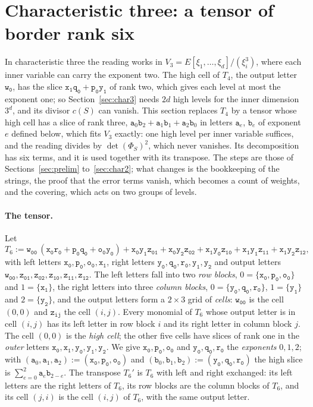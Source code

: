 \documentclass[11pt]{article}
\theoremstyle{definition}
\theoremstyle{remark}
\newcommand{\tl}[1]{\mathtt{#1}}
\begin{document}
\section{Characteristic three: a tensor of border rank six}\label{sec:t6}

In characteristic three the reading works in $V_3=E[\xi_1,\dots,\xi_d]/(\xi_i^3)$, where each inner variable can carry the exponent two. The high cell of $T_4$, the output letter $\tl{w_0}$, has the slice $\tl{x_1q_0}+\tl{p_0y_1}$ of rank two, which gives each level at most the exponent one; so Section~\ref{sec:char3} needs $2d$ high levels for the inner dimension $3^d$, and its divisor $c(S)$ can vanish. This section replaces $T_4$ by a tensor whose high cell has a slice of rank three, $\mathtt a_0\mathtt b_2+\mathtt a_1\mathtt b_1+\mathtt a_2\mathtt b_0$ in letters $\mathtt a_e$, $\mathtt b_e$ of exponent $e$ defined below, which fits $V_3$ exactly: one high level per inner variable suffices, and the reading divides by $\det(\Phi_S)^2$, which never vanishes. Its decomposition has six terms, and it is used together with its transpose. The steps are those of Sections~\ref{sec:prelim} to~\ref{sec:char2}; what changes is the bookkeeping of the strings, the proof that the error terms vanish, which becomes a count of weights, and the covering, which acts on two groups of levels.

\paragraph{The tensor.} Let
\[
T_6:=\tl{w_{00}}\,(\tl{x_0r_0}+\tl{p_0q_0}+\tl{o_0y_0})+\tl{x_0y_1z_{01}}+\tl{x_0y_2z_{02}}+\tl{x_1y_0z_{10}}+\tl{x_1y_1z_{11}}+\tl{x_1y_2z_{12}},
\]
with left letters $\tl{x_0},\tl{p_0},\tl{o_0},\tl{x_1}$, right letters $\tl{y_0},\tl{q_0},\tl{r_0},\tl{y_1},\tl{y_2}$ and output letters $\tl{w_{00}},\tl{z_{01}},\tl{z_{02}},\tl{z_{10}},\tl{z_{11}},\tl{z_{12}}$. The left letters fall into two \emph{row blocks}, $0=\{\tl{x_0},\tl{p_0},\tl{o_0}\}$ and $1=\{\tl{x_1}\}$, the right letters into three \emph{column blocks}, $0=\{\tl{y_0},\tl{q_0},\tl{r_0}\}$, $1=\{\tl{y_1}\}$ and $2=\{\tl{y_2}\}$, and the output letters form a $2\times3$ grid of \emph{cells}: $\tl{w_{00}}$ is the cell $(0,0)$ and $\tl{z_{ij}}$ the cell $(i,j)$. Every monomial of $T_6$ whose output letter is in cell $(i,j)$ has its left letter in row block $i$ and its right letter in column block $j$. The cell $(0,0)$ is the \emph{high cell}; the other five cells have slices of rank one in the \emph{outer} letters $\tl{x_0},\tl{x_1},\tl{y_0},\tl{y_1},\tl{y_2}$. We give $\tl{x_0},\tl{p_0},\tl{o_0}$ and $\tl{y_0},\tl{q_0},\tl{r_0}$ the \emph{exponents} $0,1,2$; with $(\mathtt a_0,\mathtt a_1,\mathtt a_2):=(\tl{x_0},\tl{p_0},\tl{o_0})$ and $(\mathtt b_0,\mathtt b_1,\mathtt b_2):=(\tl{y_0},\tl{q_0},\tl{r_0})$ the high slice is $\sum_{e=0}^2\mathtt a_e\mathtt b_{2-e}$. The transpose $T_6'$ is $T_6$ with left and right exchanged: its left letters are the right letters of $T_6$, its row blocks are the column blocks of $T_6$, and its cell $(j,i)$ is the cell $(i,j)$ of $T_6$, with the same output letter.
\end{document}
